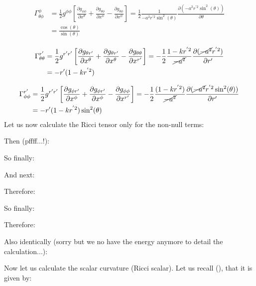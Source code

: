 	\begin{gather*}
		\begin{aligned}
		\Gamma^\phi_{\theta\phi}&=\frac{1}{2} g^{\phi\phi}\left[\frac{\partial g_{\phi \phi}}{\partial x^\theta}+\frac{\partial g_{\theta \phi}}{\partial x^\phi}-\frac{\partial g_{\theta\phi}}{\partial x^\phi}\right]=\frac{1}{2}\frac{1}{-a^2 r^{'2}\sin^2(\theta)} \frac{\partial(-a^2 r^{'2} \sin^2(\theta))}{\partial \theta}\\
		&=\frac{\cos(\theta)}{\sin(\theta)}
		\end{aligned}
	\end{gather*}
	
	\begin{gather*}
		\begin{aligned}
		\Gamma^{r'}_{\theta\theta}&=\frac{1}{2} g^{r'r'}\left[\frac{\partial g_{\theta r'}}{\partial x^\theta}+\frac{\partial g_{\theta r'}}{\partial x^\theta}-\frac{\partial g_{\theta\theta}}{\partial x^{r'}}\right]=-\frac{1}{2}\frac{1-k r^{'2}}{\cancel{-a^2}} \frac{\partial(\cancel{-a^2} r^{'2})}{\partial r'}\\
		&=-r'(1-k r^{'2})
		\end{aligned}
	\end{gather*}
	
	\begin{gather*}
		\begin{aligned}
		\Gamma^{r'}_{\phi\phi}&=\frac{1}{2} g^{r'r'}\left[\frac{\partial g_{\phi r'}}{\partial x^\phi}+\frac{\partial g_{\phi r'}}{\partial x^\phi}-\frac{\partial g_{\phi\phi}}{\partial x^{r'}}\right]=-\frac{1}{2}\frac{(1-k r^{'2})}{\cancel{-a^2}} \frac{\partial(\cancel{-a^2} r^{'2} \sin^2(\theta))}{\partial r'}\\
		&=-r'(1-k r^{'2})\sin^2(\theta)
		\end{aligned}
	\end{gather*}
	Let us now calculate the Ricci tensor only for the non-null terms:
	
	Then (pffff...!):
	
	So finally:
	
	And next:
	
	Therefore:
	
	So finally:
	
	
	Therefore:
	
	Also identically (sorry but we no have the energy anymore to detail the calculation...):
	
	Now let us calculate the scalar curvature (Ricci scalar). Let us recall (), that it is given by:
	
